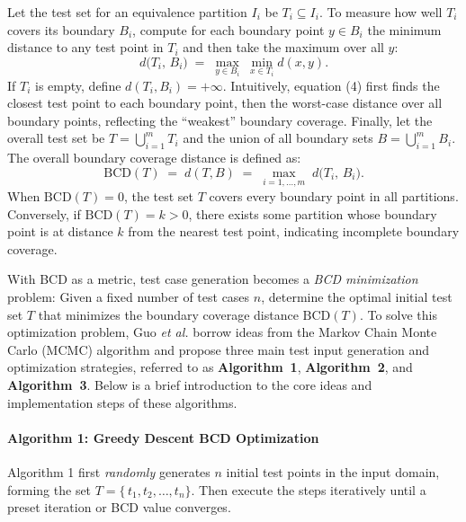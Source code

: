 \documentclass[manuscript,screen,review]{acmart}
\begin{document}
Let the test set for an equivalence partition $I_i$ be $T_i \subseteq I_i$. To measure how well $T_i$ covers its boundary $B_i$,  compute for each boundary point $y \in B_i$ the minimum distance to any test point in $T_i$ and then take the maximum over all $y$:
\begin{equation}
d\bigl(T_i,\, B_i \bigr) \;=\; \max_{y \in B_i} \; \min_{x \in T_i} d(x,y). \tag{4}
\end{equation}
If $T_i$ is empty, define $d(T_i,B_i) = +\infty$. Intuitively, equation (4) first finds the closest test point to each boundary point, then the worst-case distance over all boundary points, reflecting the ``weakest'' boundary coverage. Finally, let the overall test set be $T = \bigcup_{i=1}^m T_i$ and the union of all boundary sets $B = \bigcup_{i=1}^m B_i$. The overall boundary coverage distance is defined as:
\begin{equation}
\mathrm{BCD}(T) \;=\; d(T,B) \;=\; \max_{i=1,\ldots,m}\; d\bigl(T_i,\, B_i\bigr). \tag{5}
\end{equation}
When $\mathrm{BCD}(T) = 0$, the test set $T$ covers every boundary point in all partitions. Conversely, if $\mathrm{BCD}(T) = k > 0$, there exists some partition whose boundary point is at distance $k$ from the nearest test point, indicating incomplete boundary coverage.

With BCD as a metric, test case generation becomes a \emph{BCD minimization} problem: Given a fixed number of test cases $n$, determine the optimal initial test set $T$ that minimizes the boundary coverage distance $\mathrm{BCD}(T)$. To solve this optimization problem, Guo \textit{et al.}\cite{Guo2024} borrow ideas from the Markov Chain Monte Carlo (MCMC) algorithm and propose three main test input generation and optimization strategies, referred to as \textbf{Algorithm~1}, \textbf{Algorithm~2}, and \textbf{Algorithm~3}. Below is a brief introduction to the core ideas and implementation steps of these algorithms.

\paragraph{Algorithm 1: Greedy Descent BCD Optimization}  
Algorithm 1 first \emph{randomly} generates $n$ initial test points in the input domain, forming the set $T = \{\, t_1, t_2, \ldots, t_n \}$. Then execute the steps iteratively until a preset iteration or BCD value converges.
\end{document}
